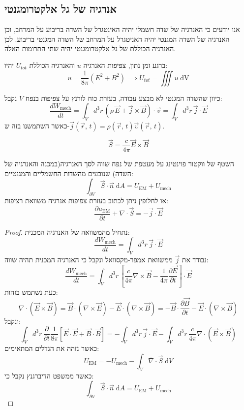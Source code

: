 \documentclass{tstextbook}
\begin{document}
\subsection{אנרגיה של גל אלקטרומגנטי}

אנו יודעים כי האנרגיה של שדה חשמלי יהיה האינטגרל של השדה בריבוע על המרחב, וכן האנרגיה של השדה המגנטי יהיה האניטגרל על המרחב של השדה המגנטי בריבוע. לכן האנרגיה הכוללת של גל אלקטרומגנטי יהיה שתי התרומות האלה.

\begin{proposition}
ברגע זמן נתון, צפיפות האנרגיה \(u\) והאנרגיה הכוללת \(U_{tot}\) יהיו:
$$u=\frac{1}{8\pi}\left( E^{2}+B^{2} \right)\implies U_{tot}=\iiint u \;\mathrm{dV}$$

\end{proposition}
\begin{proposition}
כיוון שהשדה המגנטי לא מבצע עבודה, בעזרת כוח לורנץ על צפיפות בנפח \(V\) נקבל:
$$\frac{d W_{\mathrm{mech}}}{d t}=\int_{V}d^{3}r\,(\rho\,\vec{E}+\vec{j}\times\vec{B})\cdot{\vec{v}}=\int_{V}d^{3}r\,\vec{j}\cdot\vec{E}$$
כאשר השתמשנו בזה ש-\(\vec{j}(\vec{r},\,t)=\rho(\vec{r},\,t){\vec{\upsilon}}(\vec{r},\,t)\). 

\end{proposition}
\begin{definition}
$${\vec S}=\frac{c}{4\pi}{\vec E}\times{\vec B}$$

\end{definition}
\begin{proposition}
השטף של ווקטור פוינטינג על מעטפת של נפח שווה לסך האנרגיה(במכנה והאנרגיה של השדה) שנובעים מהשדות החשמליים והמגנטיים:
$$\int_{\partial V}\vec{S}\cdot\vec{n}\;\mathrm{d}A=U_{\mathrm{EM}}+U_{\mathrm{mech}}$$
או לחלופין ניתן לכתוב בעזרת צפיפות אנרגיה משוואת רציפות:
$$\frac{\partial u_{\mathrm{EM}}}{\partial t}+\nabla\cdot{\vec S}=-{\vec j}\cdot{\vec E}$$

\end{proposition}
\begin{proof}
נתחיל מהמשוואה של האנרגיה המכנית:
$$\frac{d W_{\mathrm{mech}}}{d t}=\int_{V}d^{3}r\,\vec{j}\cdot\vec{E}$$
נבודד את \(\vec{j}\) ממשוואת אמפר-מקסוואל ונקבל כי האנרגיה המכנית תהיה שווה:
$$\frac{d W_{\mathrm{mech}}}{d t}=\int_{V}d^{3}r\,\left[\frac{c}{4\pi}\nabla\times{\vec B}-\frac{1}{4\pi}\frac{\partial{\vec E}}{\partial t}\right]\cdot{\vec E}$$
כעת נשתמש בזהות:
$$\nabla\cdot\left(\vec{E}\times\vec{B}\right)=\vec{B}\cdot\left(\nabla\times\vec{E}\right)-\vec{E}\cdot\left(\nabla\times\vec{B}\right)=-\vec{B}\cdot{\frac{\partial\vec{B}}{\partial t}}-\vec{E}\cdot\left(\nabla\times\vec{B}\right)$$
ונקבל:
$$\int_{V}d^{3}r\,{\frac{\partial}{\partial t}}{\frac{1}{8\pi}}\left[\vec{E}\cdot\vec{E}+\vec{B}\cdot\vec{B}\right]=-\int_{V}d^{3}r\,\vec{j}\cdot\vec{E}-\int_{V}d^{3}r\,{\frac{c}{4\pi}}\nabla\cdot\left(\vec{E}\times\vec{B}\right)$$
כאשר נזהה את הגדלים המתאימים:
$$U_{\mathrm{EM}}=-U_{\mathrm{mech}}-\int_{V}\bar{\nabla} \cdot \vec{S} \;\mathrm{d}V$$
כאשר ממשפט הדיברגנץ נקבל כי:
$$\int_{\partial V}\vec{S}\cdot\vec{n}\;\mathrm{d}A=U_{\mathrm{EM}}+U_{\mathrm{mech}}$$

\end{proof}
\end{document}
